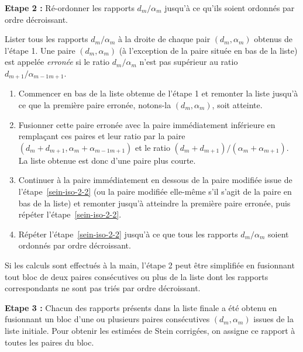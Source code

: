     \bigskip\noindent%
    \textbf{Etape 2 :} Ré-ordonner les rapports $d_m/\alpha_m$ jusqu'à ce qu'ils soient ordonnés par ordre décroissant.
    
    Lister tous les rapports $d_m/\alpha_m$ à la droite de chaque pair $(d_m, \alpha_m)$ obtenus de l'étape 1. Une paire $(d_m, \alpha_m)$ (à l'exception de la paire située en bas de la liste) est appelée \emph{erronée} si le ratio $d_m/\alpha_m$ n'est pas supérieur au ratio $d_{m+1}/\alpha_{m-1m+1}$.
    \begin{enumerate}[label={(\alph*)}]
        \item Commencer en bas de la liste obtenue de l'étape 1 et remonter la liste jusqu'à ce que la première paire erronée, notons-la $(d_m, \alpha_m)$, soit atteinte.
        \item Fusionner cette paire erronée avec la paire immédiatement inférieure en remplaçant ces paires et leur ratio par la paire $(d_m + d_{m+1},\alpha_m + \alpha_{m-1m+1})$ et le ratio $(d_m + d_{m+1})/(\alpha_m + \alpha_{m+1})$. La liste obtenue est donc d'une paire plus courte.\label{sein-iso-2-2}
        \item Continuer à la paire immédiatement en dessous de la paire modifiée issue de l'étape~\ref{sein-iso-2-2} (ou la paire modifiée elle-même s'il s'agit de la paire en bas de la liste) et remonter jusqu'à atteindre la première paire erronée, puis répéter l'étape~\ref{sein-iso-2-2}.\label{sein-iso-2-3}
        \item Répéter l'étape~\ref{sein-iso-2-2} jusqu'à ce que tous les rapports $d_m/\alpha_m$ soient ordonnés par ordre décroissant.
    \end{enumerate}
    Si les calculs sont effectués à la main, l'étape 2 peut être simplifiée en fusionnant tout bloc de deux paires consécutives ou plus de la liste dont les rapports correspondants ne sont pas triés par ordre décroissant.
    
    \bigskip\noindent%
    \textbf{Etape 3 :} Chacun des rapports présents dans la liste finale a été obtenu en fusionnant un bloc d'une ou plusieurs paires consécutives $(d_m,\alpha_m)$ issues de la liste initiale. Pour obtenir les estimées de Stein corrigées, on assigne ce rapport à toutes les paires du bloc.
    
